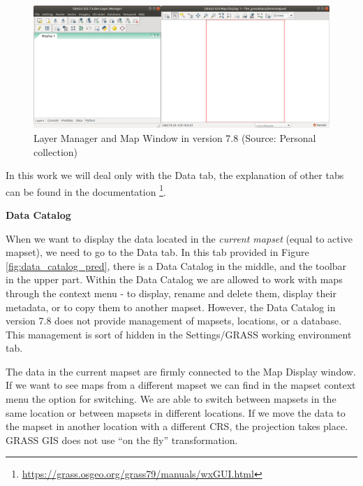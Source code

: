 \documentclass[a4paper,10pt,twoside]{article}
\begin{document}
\vspace{0.3cm}
\begin{figure}[hbt!] 
\begin{center}
\includegraphics[width=17cm]{../pictures/empty_layers1.png} 
\caption[Layer Manager and Map Window in version 7.8]{Layer Manager and Map Window in version 7.8 (Source: Personal collection)}
\label{fig:empty_layers1}
\end{center}
\end{figure}

\noindent In this work we will deal only with the Data tab, the explanation of other tabs can be found in the documentation \footnote{\url{https://grass.osgeo.org/grass79/manuals/wxGUI.html}}.
 
\bigskip
\noindent \textbf {Data Catalog}

\noindent When we want to display the data located in the \textit{current mapset} (equal to active mapset), we need to go to the Data tab. In this tab provided in Figure \ref{fig:data_catalog_pred}, there is a Data Catalog in the middle, and the toolbar in the upper part. Within the Data Catalog we are allowed to work with maps through the context menu - to display, rename and delete them, display their metadata, or to copy them to another mapset. However, the Data Catalog in version 7.8 does not provide management of mapsets, locations, or a database. This management is sort of hidden in the Settings/GRASS working environment tab.

The data in the current mapset are firmly connected to the Map Display window. If we want to see maps from a different mapset we can find in the mapset context menu the option for switching. We are able to switch between mapsets in the same location or between mapsets in different locations. If we move the data to the mapset in another location with a different CRS, the projection takes place. GRASS GIS does not use ``on the fly'' transformation.
\end{document}
